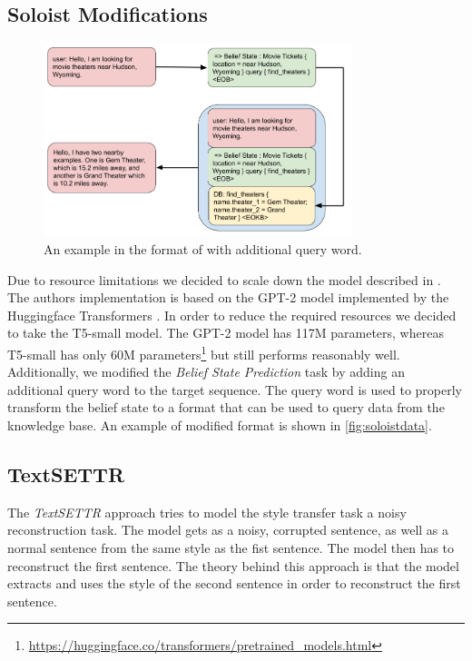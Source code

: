 \documentclass[twocolumn]{tum-article}
\begin{document}
\subsection{Soloist Modifications}
\label{sec:soloist_mod}
\begin{figure}[!h]
\centering
\includegraphics[width=0.8\textwidth]{figures/Soloist_Data.png}
\caption{An example in the format of \cite{peng2020soloist} with additional query word.}
\label{fig:soloistdata}
\end{figure}
Due to resource limitations we decided to scale down the model described in \cite{peng2020soloist}. The authors implementation is based on the GPT-2 model \cite{radford2019language} implemented by the Huggingface Transformers \cite{wolf2019huggingface}. In order to reduce the required resources we decided to take the T5-small \cite{raffel2019exploring} model. The GPT-2 model has 117M parameters, whereas T5-small has only 60M parameters\footnote{\url{https://huggingface.co/transformers/pretrained_models.html}} but still performs reasonably well.
Additionally, we modified the \textit{Belief State Prediction} task by adding an additional query word to the target sequence. The query word is used to properly transform the belief state to a format that can be used to query data from the knowledge base. An example of modified format is shown in \autoref{fig:soloistdata}. 
\subsection{TextSETTR} \label{sec:textsettr}
The \textit{TextSETTR} \cite{riley2020textsettr} approach tries to model the style transfer task a noisy reconstruction task. The model gets as a noisy, corrupted sentence, as well as a normal sentence from the same style as the fist sentence. The model then has to reconstruct the first sentence. The theory behind this approach is that the model extracts and uses the style of the second sentence in order to reconstruct the first sentence.\\
\end{document}
